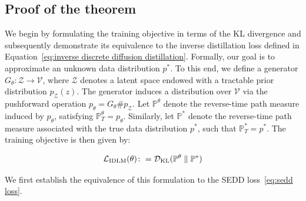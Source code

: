     \subsection{Proof of the theorem}
        \label{app: proof of the theorem}
        We begin by formulating the training objective in terms of the KL divergence and subsequently demonstrate its equivalence to the inverse distillation loss defined in Equation~\eqref{eq:inverse discrete diffusion distillation}. Formally, our goal is to approximate an unknown data distribution $p^*$. To this end, we define a generator $G_{\theta} : \mathcal{Z} \to \mathcal{V}$, where $\mathcal{Z}$ denotes a latent space endowed with a tractable prior distribution $p_{\mathcal{Z}}(z)$. The generator induces a distribution over $\mathcal{V}$ via the pushforward operation $p_{\theta} = G_{\theta} \# p_{\mathcal{Z}}.$ Let $\mathbb{P}^{\theta}$ denote the reverse-time path measure induced by $p_{\theta}$, satisfying $\mathbb{P}^{\theta}_T = p_{\theta}$. Similarly, let $\mathbb{P}^{*}$ denote the reverse-time path measure associated with the true data distribution $p^*$, such that $\mathbb{P}^{*}_T = p^*$. The training objective is then given by:
        
        \begin{equation} 
        \label{eq: kl definition} 
            \mathcal{L}_{\text{IDLM}}(\theta) \colon= \mathcal{D}_{\text{KL}} (\mathbb{P}^{\theta} \parallel \mathbb{P}^*) 
        \end{equation}
        
        We first establish the equivalence of this formulation to the SEDD loss~\eqref{eq:sedd loss}.

